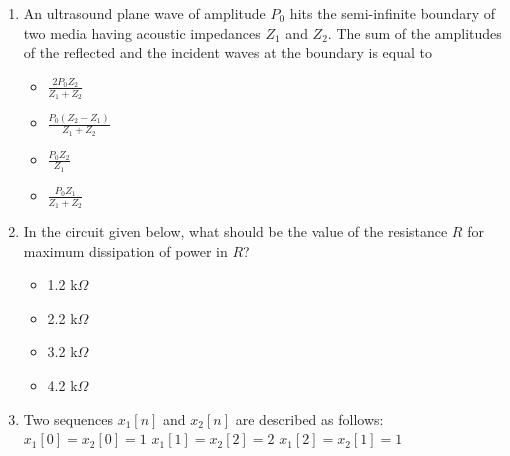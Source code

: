 \documentclass[journal]{IEEEtran}
\begin{document}
\begin{enumerate}
\item  
An ultrasound plane wave of amplitude \( P_0 \) hits the semi-infinite boundary of two media having acoustic impedances \( Z_1 \) and \( Z_2 \). The sum of the amplitudes of the reflected and the incident waves at the boundary is equal to 

\vspace{0.3cm}

\begin{itemize}
    \item \( \frac{2 P_0 Z_2}{Z_1 + Z_2} \)
    \item \( \frac{P_0 (Z_2 - Z_1)}{Z_1 + Z_2} \)
    \item \( \frac{P_0 Z_2}{Z_1} \)
    \item \( \frac{P_0 Z_1}{Z_1 + Z_2} \)
\end{itemize}
\hfill{}

\item 
In the circuit given below, what should be the value of the resistance $R$ for maximum dissipation of power in $R$?

\begin{figure}[H]
\centering
{}%

\label{fig:my_label}
\end{figure}

\bigskip

\begin{itemize}
    \item 1.2 k$\Omega$
    \item 2.2 k$\Omega$
    \item 3.2 k$\Omega$
    \item 4.2 k$\Omega$
\end{itemize}
\hfill{}

\item 
Two sequences \( x_1[n] \) and \( x_2[n] \) are described as follows:
$
x_1[0] = x_2[0] = 1
$
$
x_1[1] = x_2[2] = 2
$
$
x_1[2] = x_2[1] = 1
$


\end{enumerate}
\end{document}
